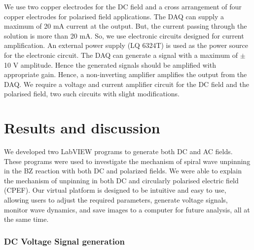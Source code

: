 \documentclass[journal=jacsat,manuscript=article]{achemso}
\begin{document}
We use two copper electrodes for the DC field and a cross arrangement of four copper electrodes for polarised field applications. The DAQ can supply a maximum of 20 mA current at the output. But, the current passing through the solution is more than 20 mA. So, we use electronic circuits designed for current amplification. An external power supply (LQ 6324T) is used as the power source for the electronic circuit. The DAQ can generate a signal with a maximum of $\pm$ 10 V amplitude. Hence the generated signals should be amplified with appropriate gain. Hence, a non-inverting amplifier amplifies the output from the DAQ. We require a voltage and current amplifier circuit for the DC field and the polarised field, two such circuits with slight modifications.
\section{Results and discussion}
We developed two LabVIEW programs to generate both DC and AC fields. These programs were used to investigate the mechanism of spiral wave unpinning in the BZ reaction with both DC and polarized fields. We were able to explain the mechanism of unpinning in both DC \cite{amrutha2022mechanism}and circularly polarised electric field \cite{sv2023theory}(CPEF). Our virtual platform is designed to be intuitive and easy to use, allowing users to adjust the required parameters, generate voltage signals, monitor wave dynamics, and save images to a computer for future analysis, all at the same time.
\subsubsection{DC Voltage Signal generation}
\end{document}
